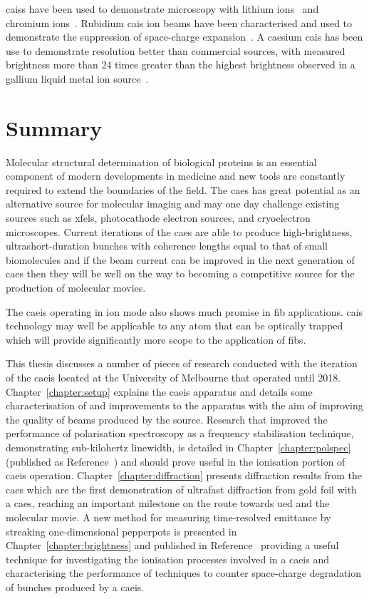 \Glspl{cais} have been used to demonstrate microscopy with lithium ions~\cite{knuffman_nanoscale_2011} and chromium ions~\cite{steele_focused_2010}.
Rubidium \gls{cais} ion beams have been characterised and used to demonstrate the suppression of space-charge expansion~\cite{murphy_detailed_2014,thompson_suppression_2016}.
A caesium \gls{cais} has been use to demonstrate resolution better than commercial sources, with measured brightness more than 24 times greater than the highest brightness observed in a gallium liquid metal ion source~\cite{steele_high-brightness_2017}.

\section{Summary}

Molecular structural determination of biological proteins is an essential component of modern developments in medicine and new tools are constantly required to extend the boundaries of the field.
The \gls{caes} has great potential as an alternative source for molecular imaging and may one day challenge existing sources such as \glspl{xfel}, photocathode electron sources, and cryoelectron microscopes.
Current iterations of the \gls{caes} are able to produce high-brightness, ultrashort-duration bunches with coherence lengths equal to that of small biomolecules and if the beam current can be improved in the next generation of \gls{caes} then they will be well on the way to becoming a competitive source for the production of molecular movies.

The \gls{caeis} operating in ion mode also shows much promise in \gls{fib} applications.
\Gls{cais} technology may well be applicable to any atom that can be optically trapped which will provide significantly more scope to the application of \glspl{fib}.

This thesis discusses a number of pieces of research conducted with the iteration of the \gls{caeis} located at the University of Melbourne that operated until 2018.
Chapter~\ref{chapter:setup} explains the \gls{caeis} apparatus and details some characterisation of and improvements to the apparatus with the aim of improving the quality of beams produced by the source.
Research that improved the performance of polarisation spectroscopy as a frequency stabilisation technique, demonstrating sub-kilohertz linewidth, is detailed in Chapter~\ref{chapter:polspec} (published as Reference~\cite{torrance_sub-kilohertz_2016}) and should prove useful in the ionisation portion of \gls{caeis} operation.
Chapter~\ref{chapter:diffraction} presents diffraction results from the \gls{caes} which are the first demonstration of ultrafast diffraction from gold foil with a \gls{caes}, reaching an important milestone on the route towards \gls{ued} and the molecular movie.
A new method for measuring time-resolved emittance by streaking one-dimensional pepperpots is presented in Chapter~\ref{chapter:brightness} and published in Reference~\cite{torrance_time-resolved_2018} providing a useful technique for investigating the ionisation processes involved in a \gls{caeis} and characterising the performance of techniques to counter space-charge degradation of bunches produced by a \gls{caeis}.
